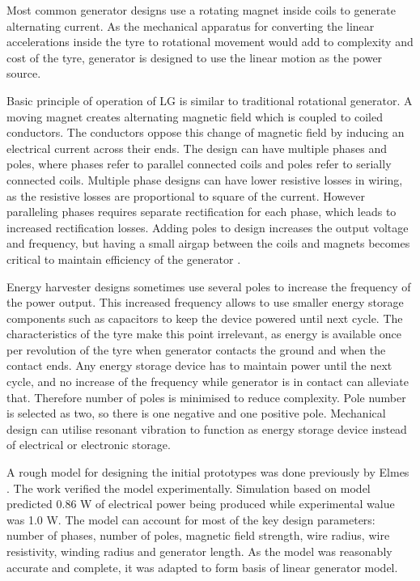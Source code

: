 Most common generator designs use a rotating magnet inside coils to generate alternating current. As the mechanical apparatus for converting the linear accelerations inside the tyre to rotational movement would add to complexity and cost of the tyre, generator is designed to use the linear motion as the power source.

Basic principle of operation of LG is similar to traditional rotational generator. A moving magnet creates alternating magnetic field which is coupled to coiled conductors. The conductors oppose this change of magnetic field by inducing an electrical current across their ends. The design can have multiple phases and poles, where phases refer to parallel connected coils and poles refer to serially connected coils. Multiple phase designs can have lower resistive losses in wiring, as the resistive losses are proportional to square of the current. However paralleling phases requires separate rectification for each phase, which leads to increased rectification losses. Adding poles to design increases the output voltage and frequency, but having a small airgap between the coils and magnets becomes critical to maintain efficiency of the generator \cite{Cheng2008}. 

Energy harvester designs sometimes use several poles to increase the frequency of the power output. This increased frequency allows to use smaller energy storage components such as capacitors to keep the device powered until next cycle. The characteristics of the tyre make this point irrelevant, as energy is available once per revolution of the tyre when generator contacts the ground and when the contact ends. Any energy storage device has to maintain power until the next cycle, and no increase of the frequency while generator is in contact can alleviate that. Therefore number of poles is minimised to reduce complexity. Pole number is selected as two, so there is one negative and one positive pole. Mechanical design can utilise resonant vibration to function as energy storage device instead of electrical or electronic storage.

A rough model for designing the initial prototypes was done previously by Elmes \cite{Elmes2005}. The work verified the model experimentally. Simulation based on model predicted 0.86 W of electrical power being produced while experimental walue was 1.0 W. The model can account for most of the key design parameters: number of phases, number of poles, magnetic field strength, wire radius, wire resistivity, winding radius and generator length. As the model was reasonably accurate and complete, it was adapted to form basis of linear generator model. 


